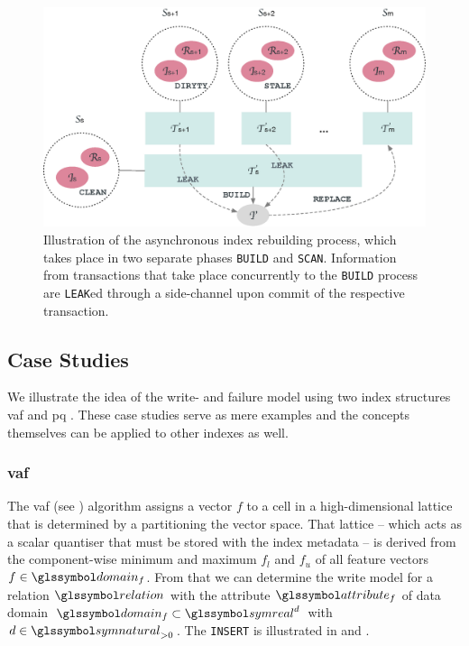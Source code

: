 \begin{figure}
    \centering
    \includegraphics[width=\textwidth]{figures/asynchronous-index-rebuilding}
    \caption{Illustration of the asynchronous index rebuilding process, which takes place in two separate phases \texttt{BUILD} and \texttt{SCAN}. Information from transactions that take place concurrently to the  \texttt{BUILD} process are \texttt{LEAK}ed through a side-channel upon commit of the respective transaction.}
    \label{figure:async_index_rebuild}
\end{figure}

\subsection{Case Studies}

We illustrate the idea of the write- and failure model using two index structures \acrshort{vaf} \cite{Weber:1998Va} and \acrshort{pq} \cite{Jegou:2010Product}. These case studies serve as mere examples and the concepts themselves can be applied to other indexes as well.

\subsubsection{\texorpdfstring{\acrfull{vaf}}{VAF}}

The \acrshort{vaf} (see ) algorithm assigns a vector $f$ to a cell in a high-dimensional lattice that is determined by a partitioning the vector space. That lattice -- which acts as a scalar quantiser that must be stored with the index metadata -- is derived from the component-wise minimum and maximum $f_{l}$ and $f_{u}$ of all feature vectors $f \in \domain_f$. From that we can determine the write model for a relation $\relation$ with the attribute $\attribute_f$ of data domain $\domain_f \subset \symreal^d$ with $d \in \symnatural_{>0}$. The \texttt{INSERT} is illustrated in  and .

